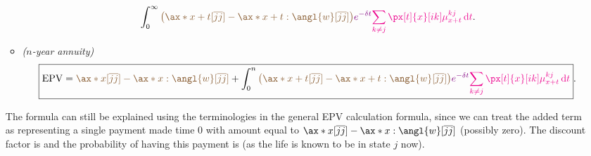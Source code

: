 \begin{enumerate}
\begin{itemize}
\[{\int_{0}^{\infty}\brc{\qty(\ax*{x+t}[\overline{jj}]-\ax*{x+t:\angl{w}}[\overline{jj}])}
\vc{e^{-\delta t}}\mgc{\sum_{k\ne j}^{}\px[t]{x}[ik]\mu_{x+t}^{kj}\dd{t}}}.
\]
\item \emph{(\(n\)-year annuity)}
\[
\boxed{\text{EPV}=\brc{\ax*{x}[\overline{jj}]-\ax*{x:\angl{w}}[\overline{jj}]}+
\int_{0}^{n}\brc{\qty(\ax*{x+t}[\overline{jj}]-\ax*{x+t:\angl{w}}[\overline{jj}])}
\vc{e^{-\delta t}}\mgc{\sum_{k\ne j}^{}\px[t]{x}[ik]\mu_{x+t}^{kj}\dd{t}}}.
\]
\end{itemize}
The formula can still be explained using the terminologies in the general EPV
calculation formula, since we can treat the added term as representing a single
payment made  time \(0\) with amount equal to
\(\ax*{x}[\overline{jj}]-\ax*{x:\angl{w}}[\overline{jj}]\) (possibly zero). The
discount factor is  and the probability of having this payment is
 (as the life is known to be in state \(j\) now).
\end{enumerate}
